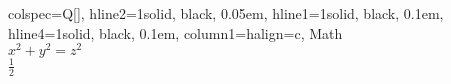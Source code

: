 \begin{table}
\centering
\begin{tblr}[         %
]                     %
{                     %
colspec={Q[]},
hline{2}={1}{solid, black, 0.05em},
hline{1}={1}{solid, black, 0.1em},
hline{4}={1}{solid, black, 0.1em},
column{1}={}{halign=c},
}                     %
Math \\
$x^2 + y^2 = z^2$ \\
$\frac{1}{2}$ \\
\end{tblr}
\end{table} 
